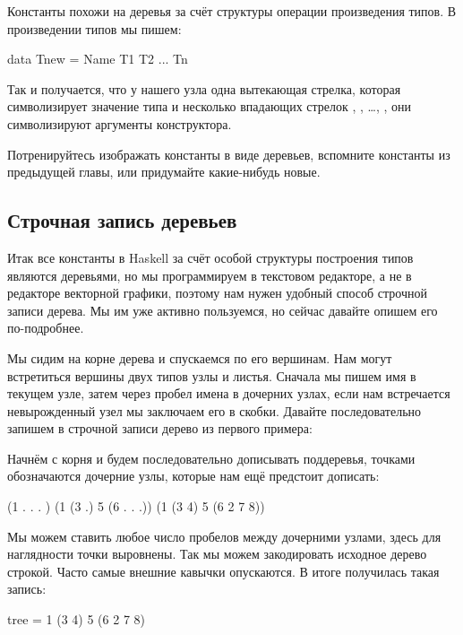 Константы похожи на деревья за счёт структуры операции
произведения типов. В произведении типов мы пишем:

\begin{code}
data Tnew = Name T1 T2 ... Tn
\end{code}

Так и получается, что у нашего узла  одна вытекающая
стрелка, которая символизирует значение типа  и несколько
впадающих стрелок , , \dots, , они символизируют 
аргументы конструктора.

Потренируйтесь изображать константы в виде деревьев, 
вспомните константы из предыдущей главы, или придумайте 
какие-нибудь новые. 

\subsection{Строчная запись деревьев}

Итак все константы в Haskell за счёт особой структуры построения
типов являются деревьями, но мы программируем в текстовом редакторе,
а не в редакторе векторной графики, поэтому нам нужен удобный способ
строчной записи дерева. Мы им уже активно пользуемся, но
сейчас давайте опишем его по-подробнее. 

Мы сидим на корне дерева и спускаемся по его вершинам. Нам
могут встретиться вершины двух типов узлы и листья. Сначала
мы пишем имя в текущем узле, затем через пробел имена в дочерних
узлах, если нам встречается невырожденный узел мы заключаем его в
скобки. Давайте последовательно запишем в строчной записи дерево
из первого примера:


Начнём с корня и будем последовательно дописывать поддеревья,
точками обозначаются дочерние узлы, которые нам ещё предстоит дописать:

\begin{code}
(1     .       .      .       )
(1    (3 .)    5     (6 . . .))
(1    (3 4)    5     (6 2 7 8))
\end{code}

Мы можем ставить любое число пробелов между дочерними узлами,
здесь для наглядности точки выровнены. Так мы можем закодировать
исходное дерево строкой. Часто самые внешние кавычки опускаются.
В итоге получилась такая запись:

\begin{code}
tree = 1 (3 4) 5 (6 2 7 8)
\end{code}

